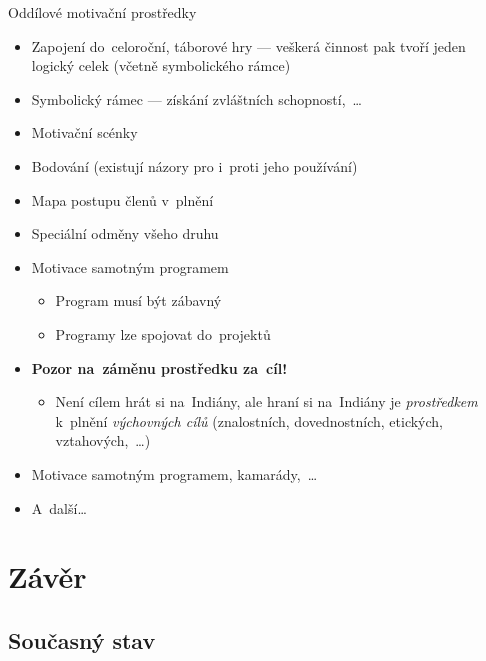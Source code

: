 \documentclass[compress, ucs, xelatex, 11pt, xcolor=dvipsnames, print,
	hyperref={
		bookmarks=true,
		unicode=true,
		colorlinks=true,
		pdftitle={Skautska vychovna metoda},
		plainpages=false,
		pdfauthor={Vojtech Zeisek},
		pdfsubject={Skautska vychovna metoda a jeji vyvoj za posledni stoleti a desetileti},
		pdfcreator={XeLaTeX},
		pdfkeywords={Junak, Pedagogika, Skaut, Skauting, Vychovna metoda},
		linkcolor=Black,
		anchorcolor=Black,
		citecolor=OliveGreen,
		filecolor=OliveGreen,
		menucolor=Black,
		urlcolor=OliveGreen,
		pdftex},
	url={hyphens, lowtilde} %
	]{beamer}
\begin{document}
\begin{frame}{Oddílové motivační prostředky}
	\begin{itemize}
		\item Zapojení do~celoroční, táborové hry --- veškerá činnost pak tvoří jeden logický celek (včetně symbolického rámce)
		\item Symbolický rámec --- získání zvláštních schopností,~\ldots
		\item Motivační scénky
		\item Bodování (existují názory pro i~proti jeho používání)
		\item Mapa postupu členů v~plnění
		\item Speciální odměny všeho druhu
		\item Motivace samotným programem
		\begin{itemize}
			\item Program musí být zábavný
			\item Programy lze spojovat do~projektů
		\end{itemize}
		\item \textbf{Pozor na~záměnu prostředku za~cíl!}
		\begin{itemize}
			\item Není cílem hrát si na~Indiány, ale hraní si na~Indiány je \textit{prostředkem} k~plnění \textit{výchovných cílů} (znalostních, dovednostních, etických, vztahových,~\ldots)
		\end{itemize}
		\item Motivace samotným programem, kamarády,~\ldots
		\item A~další\ldots
	\end{itemize}
\end{frame}

\section{Závěr}

\subsection{Současný stav}
\end{document}

